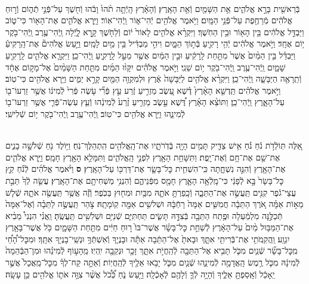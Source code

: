 \documentclass[twoside, openany, parskip=half, 11pt]{book}
\begin{document}
\begin{footnotesize}

\begin{multicols}{2}
\\
בְּֿרֵאשִׁ֖ית בָּרָ֣א אֱלֹהִ֑ים אֵ֥ת הַשָּׁמַ֖יִם וְֿאֵ֥ת הָאָֽרֶץ׃ וְֿהָאָ֗רֶץ הָֽיְֿתָ֥ה תֹ֨הוּ֙ וָבֹ֔הוּ וְֿח֖שֶׁךְ עַל־פְּֿנֵ֣י תְֿה֑וֹם וְֿר֣וּחַ אֱלֹהִ֔ים מְֿרַחֶ֖פֶת עַל־פְּֿנֵ֥י הַמָּֽיִם׃ וַיֹּ֥אמֶר אֱלֹהִ֖ים יְֿהִי־א֑וֹר וַֽיְֿהִי־אֽוֹר׃ וַיַּ֧רְא אֱלֹהִ֛ים אֶת־הָא֖וֹר כִּי־ט֑וֹב וַיַּבְדֵּ֣ל אֱלֹהִ֔ים בֵּ֥ין הָא֖וֹר וּבֵ֥ין הַחֹֽשֶׁךְ׃ וַיִּקְרָ֨א אֱלֹהִ֤ים לָאוֹר֙ י֔וֹם וְֿלַחֹ֖שֶׁךְ קָ֣רָא לָ֑יְֿלָה וַֽיְֿהִי־עֶ֥רֶב וַֽיְֿהִי־בֹ֖קֶר י֥וֹם אֶחָֽד׃
 וַיֹּ֣אמֶר אֱלֹהִ֔ים יְֿהִ֥י רָקִ֖יעַ בְּֿת֣וֹךְ הַמָּ֑יִם וִיהִ֣י מַבְדִּ֔יל בֵּ֥ין מַ֖יִם לָמָֽיִם׃ וַיַּ֣עַשׂ אֱלֹהִים֘ אֶת־הָֽרָקִיעַ֒ וַיַּבְדֵּ֗ל בֵּ֤ין הַמַּ֨יִם֙ אֲשֶׁר֙ מִתַּ֣חַת לָֽרָקִ֔יעַ וּבֵ֣ין הַמַּ֔יִם אֲשֶׁ֖ר מֵעַ֣ל לָֽרָקִ֑יעַ וַֽיְֿהִי־כֵֽן׃ וַיִּקְרָ֧א אֱלֹהִ֛ים לָֽרָקִ֖יעַ שָׁמָ֑יִם וַֽיְֿהִי־עֶ֥רֶב וַֽיְֿהִי־בֹ֖קֶר י֥וֹם שֵׁנִֽי׃
וַיֹּ֣אמֶר אֱלֹהִ֗ים יִקָּו֨וּ הַמַּ֜יִם מִתַּ֤חַת הַשָּׁמַ֨יִם֙ אֶל־מָק֣וֹם אֶחָ֔ד וְֿתֵֽרָאֶ֖ה הַיַּבָּשָׁ֑ה וַֽיְֿהִי־כֵֽן׃ וַיִּקְרָ֨א אֱלֹהִ֤ים לַיַּבָּשָׁה֙ אֶ֔רֶץ וּלְמִקְוֵ֥ה הַמַּ֖יִם קָרָ֣א יַמִּ֑ים וַיַּ֥רְא אֱלֹהִ֖ים כִּי־טֽוֹב׃ וַיֹּ֣אמֶר אֱלֹהִ֗ים תַּֽדְשֵׁ֤א הָאָ֨רֶץ֙ דֶּ֗שֶׁא עֵ֚שֶׂב מַזְרִ֣יעַ זֶ֔רַע עֵ֣ץ פְּֿרִ֞י עֹ֤שֶׂה פְּֿרִי֙ לְֿמִינ֔וֹ אֲשֶׁ֥ר זַרְעוֹ־ב֖וֹ עַל־הָאָ֑רֶץ וַֽיְֿהִי־כֵֽן׃ וַתּוֹצֵ֨א הָאָ֜רֶץ דֶּ֠שֶׁא עֵ֣שֶׂב מַזְרִ֤יעַ זֶ֨רַע֙ לְֿמִינֵ֔הוּ וְֿעֵ֧ץ עֹֽשֶׂה־פְּֿרִ֛י אֲשֶׁ֥ר זַרְעוֹ־ב֖וֹ לְֿמִינֵ֑הוּ וַיַּ֥רְא אֱלֹהִ֖ים כִּי־טֽוֹב׃ וַֽיְֿהִי־עֶ֥רֶב וַֽיְֿהִי־בֹ֖קֶר י֥וֹם שְֿׁלִישִֽׁי׃

\\
אֵ֚לֶּה תּֽוֹלְֿדֹ֣ת נֹ֔חַ נֹ֗חַ אִ֥ישׁ צַדִּ֛יק תָּמִ֥ים הָיָ֖ה בְּֿדֹֽרֹתָ֑יו אֶת־הָֽאֱלֹהִ֖ים הִֽתְהַלֶּךְ־נֹֽחַ׃ וַיּ֥וֹלֶד נֹ֖חַ שְֿׁלֹשָׁ֣ה בָנִ֑ים אֶת־שֵׁ֖ם אֶת־חָ֥ם וְֿאֶת־יָֽפֶת׃ וַתִּשָּׁחֵ֥ת הָאָ֖רֶץ לִפְנֵ֣י הָֽאֱלֹהִ֑ים וַתִּמָּלֵ֥א הָאָ֖רֶץ חָמָֽס׃ וַיַּ֧רְא אֱלֹהִ֛ים אֶת־הָאָ֖רֶץ וְֿהִנֵּ֣ה נִשְׁחָ֑תָה כִּֽי־הִשְׁחִ֧ית כׇּל־בָּשָׂ֛ר אֶת־דַּרְכּ֖וֹ עַל־הָאָֽרֶץ׃ \textbf{ס} וַיֹּ֨אמֶר אֱלֹהִ֜ים לְֿנֹ֗חַ קֵ֤ץ כׇּל־בָּשָׂר֙ בָּ֣א לְֿפָנַ֔י כִּי־מָֽלְֿאָ֥ה הָאָ֛רֶץ חָמָ֖ס מִפְּֿנֵיהֶ֑ם וְֿהִנְנִ֥י מַשְׁחִיתָ֖ם אֶת־הָאָֽרֶץ׃ עֲשֵׂ֤ה לְֿךָ֙ תֵּבַ֣ת עֲצֵי־גֹ֔פֶר קִנִּ֖ים תַּֽעֲשֶׂ֣ה אֶת־הַתֵּבָ֑ה וְֿכָֽפַרְתָּ֥ אֹתָ֛הּ מִבַּ֥יִת וּמִח֖וּץ בַּכֹּֽפֶר׃ וְֿזֶ֕ה אֲשֶׁ֥ר תַּֽעֲשֶׂ֖ה אֹתָ֑הּ שְֿׁל֧שׁ מֵא֣וֹת אַמָּ֗ה אֹ֚רֶךְ הַתֵּבָ֔ה חֲמִשִּׁ֤ים אַמָּה֙ רָחְֿבָּ֔הּ וּשְׁלשִׁ֥ים אַמָּ֖ה קֽוֹמָתָֽהּ׃ צֹ֣הַר תַּֽעֲשֶׂ֣ה לַתֵּבָ֗ה וְֿאֶל־אַמָּה֙ תְּֿכַלֶּ֣נָּה מִלְמַ֔עְלָה וּפֶ֥תַח הַתֵּבָ֖ה בְּֿצִדָּ֣הּ תָּשִׂ֑ים תַּחְתִּיִּ֛ם שְֿׁנִיִּ֥ם וּשְׁלִשִׁ֖ים תַּֽעֲשֶֽׂהָ׃  וַֽאֲנִ֗י הִנְנִי֩ מֵבִ֨יא אֶת־הַמַּבּ֥וּל מַ֨יִם֙ עַל־הָאָ֔רֶץ לְֿשַׁחֵ֣ת כׇּל־בָּשָׂ֗ר אֲשֶׁר־בּוֹ֙ ר֣וּחַ חַיִּ֔ים מִתַּ֖חַת הַשָּׁמָ֑יִם כֹּ֥ל אֲשֶׁר־בָּאָ֖רֶץ יִגְוָֽע׃ וַֽהֲקִֽמֹתִ֥י אֶת־בְּֿרִיתִ֖י אִתָּ֑ךְ וּבָאתָ֙ אֶל־הַתֵּ֔בָה אַתָּ֕ה וּבָנֶי֛ךָ וְֿאִשְׁתְּֿךָ֥ וּנְשֵֽׁי־בָנֶי֖ךָ אִתָּֽךְ׃ וּמִכׇּל־הָ֠חַ֠י מִֽכׇּל־בָּשָׂ֞ר שְֿׁנַ֧יִם מִכֹּ֛ל תָּבִ֥יא אֶל־הַתֵּבָ֖ה לְֿהַֽחֲיֹ֣ת אִתָּ֑ךְ זָכָ֥ר וּנְקֵבָ֖ה יִֽהְיֽוּ׃  מֵֽהָע֣וֹף לְֿמִינֵ֗הוּ וּמִן־הַבְּֿהֵמָה֙ לְֿמִינָ֔הּ מִכֹּ֛ל רֶ֥מֶשׂ הָֽאֲדָמָ֖ה לְֿמִינֵ֑הוּ שְֿׁנַ֧יִם מִכֹּ֛ל יָבֹ֥אוּ אֵלֶ֖יךָ לְֿהַֽחֲיֽוֹת׃ וְֿאַתָּ֣ה קַח־לְךָ֗ מִכׇּל־מַֽאֲכָל֙ אֲשֶׁ֣ר יֵֽאָכֵ֔ל וְֿאָֽסַפְתָּ֖ אֵלֶ֑יךָ וְֿהָיָ֥ה לְֿךָ֛ וְֿלָהֶ֖ם לְֿאָכְֿלָֽה׃ וַיַּ֖עַשׂ נֹ֑חַ כְּֿ֠כֹ֠ל אֲשֶׁ֨ר צִוָּ֥ה אֹת֛וֹ אֱלֹהִ֖ים כֵּ֥ן עָשָֽׂה׃


\end{multicols}
\end{footnotesize}
\end{document}
